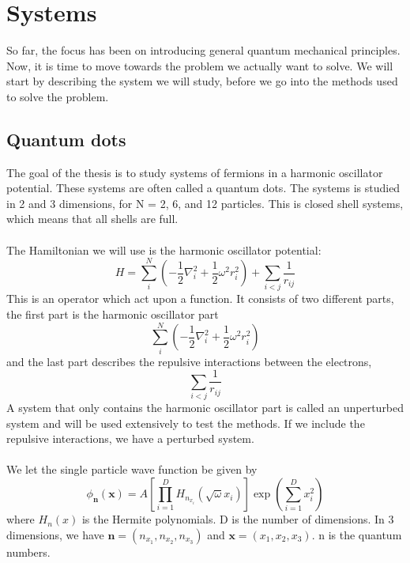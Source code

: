\section{Systems}
So far, the focus has been on introducing general quantum mechanical principles. Now, it is time to move towards the problem we actually want to solve. We will start by describing the system we will study, before we go into the methods used to solve the problem. 
\subsection{Quantum dots}
The goal of the thesis is to study systems of fermions in a harmonic oscillator potential. These systems are often called a quantum dots. The systems is studied in 2 and 3 dimensions, for N = 2, 6, and 12 particles. This is closed shell systems, which means that all shells are full. 
\\
\\
The Hamiltonian we will use is the harmonic oscillator potential:
\begin{equation}
    H = \sum_i^N \left(-\frac{1}{2}\nabla^2_i + \frac{1}{2} \omega^2 r_i^2 \right) + \sum_{i<j}\frac{1}{r_{ij}}
\end{equation}
This is an operator which act upon a function. It consists of two different parts, the first part is the harmonic oscillator part
\begin{equation}
    \sum_i^N \left(-\frac{1}{2}\nabla^2_i + \frac{1}{2} \omega^2 r_i^2 \right)
\end{equation}
and the last part describes the repulsive interactions between the electrons,
\begin{equation}
    \sum_{i<j}\frac{1}{r_{ij}}
\end{equation}
A system that only contains the harmonic oscillator part is called an unperturbed system and will be used extensively to test the methods. If we include the repulsive interactions, we have a perturbed system. 
\\
\\
We let the single particle wave function be given by
\begin{equation}
    \phi_{\boldsymbol{n}}(\boldsymbol{x}) =  A\left[\prod_{i=1}^D H_{n_{x_i}}(\sqrt{\omega}x_i)\right]\exp\left(\sum_{i=1}^D x_i^2\right)
\end{equation}
where $H_n(x)$ is the Hermite polynomials. D is the number of dimensions. In 3 dimensions, we have $\boldsymbol{n} = (n_{x_1}, n_{x_2}, n_{x_3})$ and $\boldsymbol{x} = (x_1, x_2, x_3)$. n is the quantum numbers. 
